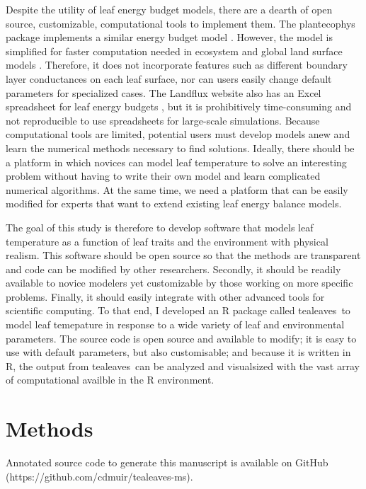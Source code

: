 \documentclass[11pt, oneside]{article}
\newcommand{\pkg}[1]{{\fontseries{b}\selectfont #1}}
\newcommand{\tealeaves}{\pkg{tealeaves}}
\begin{document}
Despite the utility of leaf energy budget models, there are a dearth of open source, customizable, computational tools to implement them. The \pkg{plantecophys} package implements a similar energy budget model \citep{Duursma_2015}. However, the model is simplified for faster computation needed in ecosystem and global land surface models \citep{Leuning_1995}. Therefore, it does not incorporate features such as different boundary layer conductances on each leaf surface, nor can users easily change default parameters for specialized cases. The Landflux website also has an Excel spreadsheet for leaf energy budgets \citep{Landflux_2019}, but it is prohibitively time-consuming and not reproducible to use spreadsheets for large-scale simulations. Because computational tools are limited, potential users must develop models anew and learn the numerical methods necessary to find solutions. Ideally, there should be a platform in which novices can model leaf temperature to solve an interesting problem without having to write their own model and learn complicated numerical algorithms. At the same time, we need a platform that can be easily modified for experts that want to extend existing leaf energy balance models.

The goal of this study is therefore to develop software that models leaf temperature as a function of leaf traits and the environment with physical realism. This software should be open source so that the methods are transparent and code can be modified by other researchers. Secondly, it should be readily available to novice modelers yet customizable by those working on more specific problems. Finally, it should easily integrate with other advanced tools for scientific computing. To that end, I developed an R package called \tealeaves~to model leaf temepature in response to a wide variety of leaf and environmental parameters. The source code is open source and available to modify; it is easy to use with default parameters, but also customisable; and because it is written in R, the output from \tealeaves~can be analyzed and visualsized with the vast array of computational availble in the R environment. 

\section*{Methods}

Annotated source code to generate this manuscript is available on GitHub (https://github.com/cdmuir/tealeaves-ms).
\end{document}
